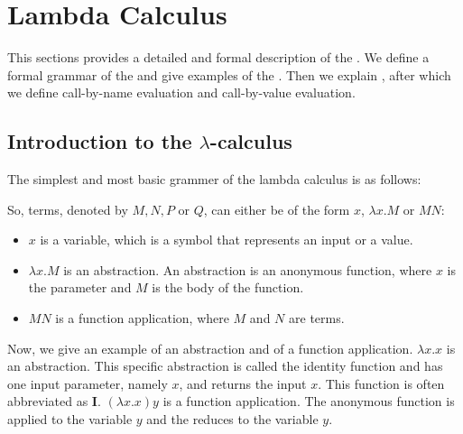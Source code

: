 \chapter{Lambda Calculus}
This sections provides a detailed and formal description of the \lc. We define a formal grammar of the \lc and give examples of the \lc.
Then we explain \br, after which we define call-by-name evaluation and call-by-value evaluation.


\section{\texorpdfstring{Introduction to the \boldmath$\lambda$-calculus}{Introduction to the Lambda Calculus}}
The simplest and most basic grammer of the lambda calculus is as follows:

\vspace{10pt}
\begin{grammar}{
	}
\end{grammar}

\vspace{10pt}
So, terms, denoted by $M, N, P$ or $Q$, can either be of the form $x$, $\lambda x.M$ or $M N$:
\begin{itemize}[noitemsep]
	\item $x$ is a variable, which is a symbol that represents an input or a value.
	\item $\lambda x.M$ is an abstraction. An abstraction is an anonymous function, where $x$ is the parameter and $M$ is the body of the function.
	\item $M N$ is a function application, where $M$ and $N$ are terms.
\end{itemize}

Now, we give an example of an abstraction and of a function application. $\lambda x. x$ is an abstraction. This specific abstraction is called the identity function and has one input parameter, namely $x$, and returns the input $x$.
This function is often abbreviated as $\mathbf{I}$. $(\lambda x. x) y$ is a function application. The anonymous function is applied to the variable $y$ and the \lterm reduces to the variable $y$.

